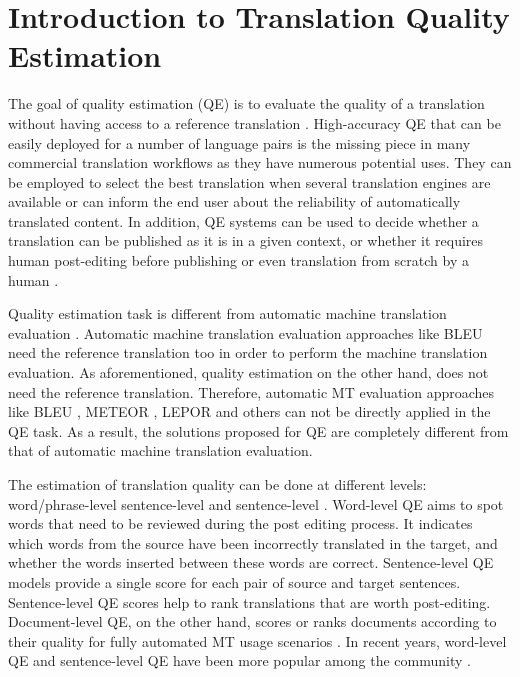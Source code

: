\DeclareRobustCommand{\hlgreen}[1]{{\sethlcolor{lime}\hl{#1}}}

\DeclareRobustCommand{\hlred}[1]{{\sethlcolor{orange}\hl{#1}}}

\newcommand{\hlc}[2][yellow]{{%
		\colorlet{foo}{#1}%
		\sethlcolor{foo}\hl{#2}}%
}


\chapter{\label{cha:qe_introduction}Introduction to Translation Quality Estimation}

The goal of quality estimation (QE) is to evaluate the quality of a translation without having access to a reference translation \autocite{specia-etal-2018-findings}. High-accuracy QE that can be easily deployed for a number of language pairs is the missing piece in many commercial translation workflows as they have numerous potential uses. They can be employed to select the best translation when several translation engines are available or can inform the end user about the reliability of automatically translated content. In addition, QE systems can be used to decide whether a translation can be published as it is in a given context, or whether it requires human post-editing before publishing or even translation from scratch by a human  \autocite{kepler-etal-2019-openkiwi}. 

Quality estimation task is different from automatic machine translation evaluation \autocite{barrault-etal-2020-findings}. Automatic machine translation evaluation approaches like BLEU \autocite{papineni-etal-2002-bleu} need the reference translation too in order to perform the machine translation evaluation. As aforementioned, quality estimation on the other hand, does not need the reference translation. Therefore, automatic MT evaluation approaches like BLEU \autocite{papineni-etal-2002-bleu}, METEOR \autocite{banerjee-lavie-2005-meteor}, LEPOR \autocite{han-etal-2012-lepor} and others can not be directly applied in the QE task. As a result, the solutions proposed for QE are completely different from that of automatic machine translation evaluation.

The estimation of translation quality can be done at different levels: word/phrase-level sentence-level and sentence-level \autocite{ive-etal-2018-deepquest}. Word-level QE aims to spot words that need to be reviewed during the post editing process. It indicates which words from the source have been incorrectly translated in the target, and whether the words inserted between these words are correct. Sentence-level QE models provide a single score for each pair of source and target sentences. Sentence-level QE scores help to rank translations that are worth post-editing. Document-level QE, on the other hand, scores or ranks documents according to their quality for fully automated MT usage scenarios \autocite{ive-etal-2018-deepquest}. In recent years, word-level QE and sentence-level QE have been more popular among the community \autocite{specia-etal-2018-findings}.

